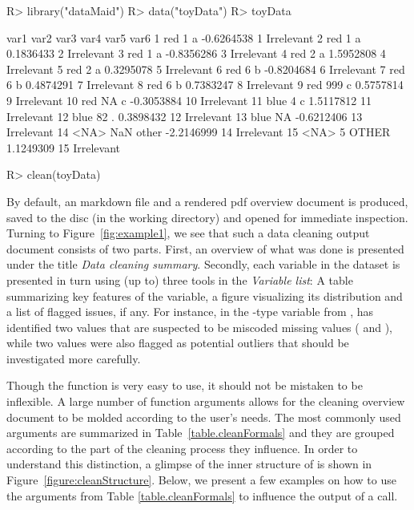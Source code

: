 \documentclass[article,shortnames]{jss}
\newcommand{\hl}[1]{\textcolor{magenta}{#1}}
\begin{document}
\begin{Schunk}
\begin{Sinput}
R> library("dataMaid")
R> data("toyData")
R> toyData
\end{Sinput}
\begin{Soutput}
   var1 var2  var3       var4 var5       var6
1   red    1     a -0.6264538    1 Irrelevant
2   red    1     a  0.1836433    2 Irrelevant
3   red    1     a -0.8356286    3 Irrelevant
4   red    2     a  1.5952808    4 Irrelevant
5   red    2     a  0.3295078    5 Irrelevant
6   red    6     b -0.8204684    6 Irrelevant
7   red    6     b  0.4874291    7 Irrelevant
8   red    6     b  0.7383247    8 Irrelevant
9   red  999     c  0.5757814    9 Irrelevant
10  red   NA     c -0.3053884   10 Irrelevant
11 blue    4     c  1.5117812   11 Irrelevant
12 blue   82     .  0.3898432   12 Irrelevant
13 blue   NA       -0.6212406   13 Irrelevant
14 <NA>  NaN other -2.2146999   14 Irrelevant
15 <NA>    5 OTHER  1.1249309   15 Irrelevant
\end{Soutput}
\end{Schunk}
\begin{Schunk}
\begin{Sinput}
R> clean(toyData)
\end{Sinput}
\end{Schunk}

By default, an  markdown file and a rendered pdf overview
document is produced, saved to the disc (in the working directory) and
opened for immediate inspection. Turning to Figure~\ref{fig:example1},
we see that such a data cleaning output document consists of two
parts. First, an overview of what was done is presented under the
title \textit{Data cleaning summary}. Secondly, each variable in the
dataset is presented in turn using (up to) three tools in the
\textit{Variable list}: A table summarizing key features of the
variable, a figure visualizing its distribution and a
list of flagged issues, if any. For instance, in the -type variable
 from ,  has identified two values that
are suspected to be miscoded missing values ( and ),
while two values were also flagged as potential outliers that should
be investigated more carefully.

Though the  function is very easy to use, it should not be
mistaken to be inflexible. A large number of function arguments allows
for the cleaning overview document to be molded according to the
user's needs. The most commonly used arguments are summarized in
Table~\ref{table.cleanFormals} and they are grouped according to the
part of the cleaning process they influence. In order to understand
this distinction, a glimpse of the inner structure of  is
shown in Figure~\ref{figure:cleanStructure}. Below, we present a few
examples on how to use the arguments from Table \ref{table.cleanFormals}
 to influence the output of a  call.
\end{document}
